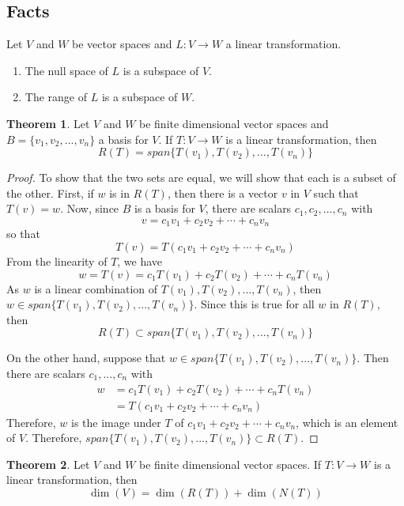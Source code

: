 \documentclass{article}
\theoremstyle{definition}
\newtheorem{theorem}{Theorem}
\begin{document}
\subsection{Facts}
Let $V$ and $W$ be vector spaces and $L: V \rightarrow W$ a linear transformation.
\begin{enumerate}[font=\sffamily\bfseries,itemsep=0pt]
	\item The null space of $L$ is a subspace of $V$.
	\item The range of $L$ is a subspace of $W$.
\end{enumerate}
\begin{theorem}
	Let $V$ and $W$ be finite dimensional vector spaces and $B = \{ v_1, v_2, ..., v_n \}$ a basis for $V$. If $T: V \rightarrow W$ is a linear transformation, then
	\[ R(T) = span\{ T(v_1), T(v_2), ..., T(v_n) \} \]
	\begin{proof}
		To show that the two sets are equal, we will show that each is a subset of the other. First, if $w$ is in $R(T)$, then there is a vector $v$ in $V$ such that $T(v) = w$. Now, since $B$ is a basis for $V$, there are scalars $c_1, c_2, ..., c_n$ with
		\[ v = c_1v_1 + c_2v_2 + \cdots + c_nv_n \]
		so that
		\[ T(v) = T(c_1v_1 + c_2v_2 + \cdots + c_nv_n) \]
		From the linearity of $T$, we have
		\[ w = T(v) = c_1T(v_1) + c_2T(v_2) + \cdots + c_nT(v_n) \]
		As $w$ is a linear combination of $T(v_1), T(v_2), ..., T(v_n)$, then \\$w \in span\{T(v_1), T(v_2), ..., T(v_n)\}$. Since this is true for all $w$ in $R(T)$, then
		\[ R(T) \subset span\{T(v_1), T(v_2), ..., T(v_n)\} \]
		\par On the other hand, suppose that $w \in span\{T(v_1), T(v_2), ..., T(v_n)\}$. Then there are scalars $c_1, ..., c_n$ with
		\begin{align*}
			w &= c_1T(v_1) + c_2T(v_2) + \cdots + c_nT(v_n)\\
			&= T(c_1v_1 + c_2v_2 + \cdots + c_nv_n)
		\end{align*}
		Therefore, $w$ is the image under $T$ of $c_1v_1 + c_2v_2 + \cdots + c_nv_n$, which is an element of $V$. Therefore, $span\{T(v_1), T(v_2), ..., T(v_n)\} \subset R(T)$.
	\end{proof}
	
\end{theorem}
\begin{theorem}
	\label{dimtheor}
	Let $V$ and $W$ be finite dimensional vector spaces. If $T: V \rightarrow W$ is a linear transformation, then
	\[ \dim(V) = \dim(R(T)) + \dim(N(T)) \]
\end{theorem}
\end{document}
